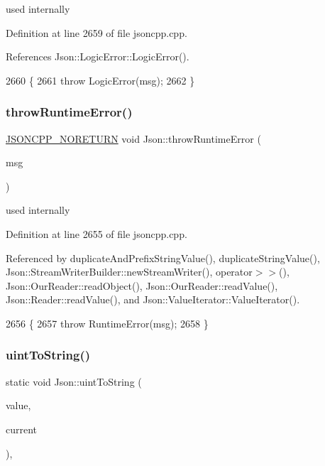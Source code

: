 used internally 



Definition at line 2659 of file jsoncpp.\+cpp.



References Json\+::\+Logic\+Error\+::\+Logic\+Error().


\begin{DoxyCode}
2660 \{
2661   \textcolor{keywordflow}{throw} LogicError(msg);
2662 \}
\end{DoxyCode}
\mbox{\label{namespace_json_a0ab7ff7f99788262d92d9ff3d924e065}} 
\subsubsection{\texorpdfstring{throw\+Runtime\+Error()}{throwRuntimeError()}}
{\footnotesize\ttfamily \hyperlink{json_8h_a78c5ba441d8b48f24a5095b97f01f282}{J\+S\+O\+N\+C\+P\+P\+\_\+\+N\+O\+R\+E\+T\+U\+RN} void Json\+::throw\+Runtime\+Error (\begin{DoxyParamCaption}\item[{\hyperlink{json_8h_a1e723f95759de062585bc4a8fd3fa4be}{J\+S\+O\+N\+C\+P\+P\+\_\+\+S\+T\+R\+I\+NG} const \&}]{msg }\end{DoxyParamCaption})}



used internally 



Definition at line 2655 of file jsoncpp.\+cpp.



Referenced by duplicate\+And\+Prefix\+String\+Value(), duplicate\+String\+Value(), Json\+::\+Stream\+Writer\+Builder\+::new\+Stream\+Writer(), operator$>$$>$(), Json\+::\+Our\+Reader\+::read\+Object(), Json\+::\+Our\+Reader\+::read\+Value(), Json\+::\+Reader\+::read\+Value(), and Json\+::\+Value\+Iterator\+::\+Value\+Iterator().


\begin{DoxyCode}
2656 \{
2657   \textcolor{keywordflow}{throw} RuntimeError(msg);
2658 \}
\end{DoxyCode}
\mbox{\label{namespace_json_ac1ffd21a9e55122014353c773ccc496e}} 
\subsubsection{\texorpdfstring{uint\+To\+String()}{uintToString()}}
{\footnotesize\ttfamily static void Json\+::uint\+To\+String (\begin{DoxyParamCaption}\item[{\hyperlink{namespace_json_ae202ecad69725e23443f465e257456d0}{Largest\+U\+Int}}]{value,  }\item[{char $\ast$\&}]{current }\end{DoxyParamCaption})\hspace{0.3cm}{\ttfamily [inline]}, {\ttfamily [static]}}

